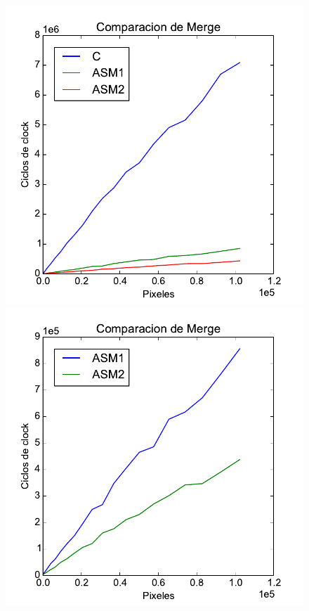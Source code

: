 \begin{figure}[h!]
	\centering
	\includegraphics[scale=0.5]{images/c_asm1_asm2_merge_comp}
	\includegraphics[scale=0.5]{images/asm1_asm2_merge_comp}
\end{figure}

